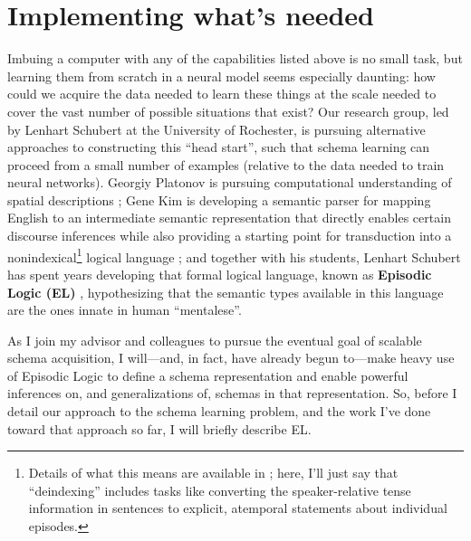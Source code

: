\section{Implementing what's needed}
Imbuing a computer with any of the capabilities listed above is no small task, but learning them from scratch in a neural model seems especially daunting: how could we acquire the data needed to learn these things at the scale needed to cover the vast number of possible situations that exist? Our research group, led by Lenhart Schubert at the University of Rochester, is pursuing alternative approaches to constructing this ``head start'', such that schema learning can proceed from a small number of examples (relative to the data needed to train neural networks). Georgiy Platonov is pursuing computational understanding of spatial descriptions \citep{platonov2018computational}; Gene Kim is developing a semantic parser for mapping English to an intermediate semantic representation that directly enables certain discourse inferences while also providing a starting point for transduction into a nonindexical\footnote{Details of what this means are available in \citep{kim2019type}; here, I'll just say that ``deindexing'' includes tasks like converting the speaker-relative tense information in sentences to explicit, atemporal statements about individual episodes.} logical language \citep{kim2019type}; and together with his students, Lenhart Schubert has spent years developing that formal logical language, known as \textbf{Episodic Logic (EL)} \citep{hwang1993}, hypothesizing that the semantic types available in this language are the ones innate in human ``mentalese''.

As I join my advisor and colleagues to pursue the eventual goal of scalable schema acquisition, I will---and, in fact, have already begun to---make heavy use of Episodic Logic to define a schema representation and enable powerful inferences on, and generalizations of, schemas in that representation. So, before I detail our approach to the schema learning problem, and the work I've done toward that approach so far, I will briefly describe EL.
